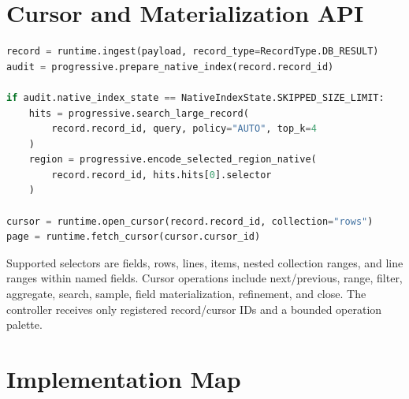 \documentclass[11pt]{article}
\begin{document}
\section{Cursor and Materialization API}

\begin{lstlisting}[language=Python]
record = runtime.ingest(payload, record_type=RecordType.DB_RESULT)
audit = progressive.prepare_native_index(record.record_id)

if audit.native_index_state == NativeIndexState.SKIPPED_SIZE_LIMIT:
    hits = progressive.search_large_record(
        record.record_id, query, policy="AUTO", top_k=4
    )
    region = progressive.encode_selected_region_native(
        record.record_id, hits.hits[0].selector
    )

cursor = runtime.open_cursor(record.record_id, collection="rows")
page = runtime.fetch_cursor(cursor.cursor_id)
\end{lstlisting}

Supported selectors are fields, rows, lines, items, nested collection ranges,
and line ranges within named fields. Cursor operations
include next/previous, range, filter, aggregate, search, sample, field
materialization, refinement, and close. The controller receives only registered
record/cursor IDs and a bounded operation palette.

\section{Implementation Map}
\end{document}
